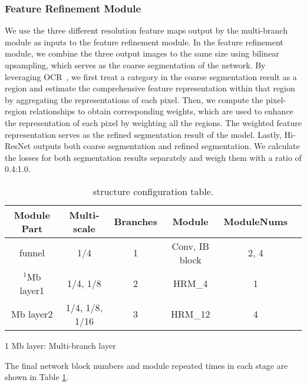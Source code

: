 \documentclass[journal]{IEEEtran}
\begin{document}
\subsubsection{Feature Refinement Module}
We use the three different resolution feature maps output by the multi-branch module as inputs to the feature refinement module. In the feature refinement module, we combine the three output images to the same size using bilinear upsampling, which serves as the coarse segmentation of the network. By leveraging OCR~\cite{yuan2019segmentation}, we first treat a category in the coarse segmentation result as a region and estimate the comprehensive feature representation within that region by aggregating the representations of each pixel. Then, we compute the pixel-region relationships to obtain corresponding weights, which are used to enhance the representation of each pixel by weighting all the regions. The weighted feature representation serves as the refined segmentation result of the model. Lastly, Hi-ResNet outputs both coarse segmentation and refined segmentation. We calculate the losses for both segmentation results separately and weigh them with a ratio of 0.4:1.0.


\begin{table}[!ht]
  \begin{center}
  \begin{threeparttable}
  \scriptsize
    \caption{structure configuration table.}
    \begin{tabular}{c|c c c c c}
    \hline
      \textbf{Module Part} & \textbf{Multi-scale} & \textbf{Branches} & \textbf{Module} & \textbf{ModuleNums}\\
      \hline
      funnel & 1/4 & 1 & Conv, IB block & 2, 4\\
      $^{\scriptscriptstyle1}$Mb layer1 & 1/4, 1/8 & 2 & HRM\_4 & 1\\
      Mb layer2 & 1/4, 1/8, 1/16 & 3 & HRM\_12 & 4\\
      \hline
    \end{tabular}
        \begin{tablenotes}
        \footnotesize  
        \item[1] Mb layer: Multi-branch layer
      \end{tablenotes} 
    \end{threeparttable}
  \end{center}
  \label{table:1}
\end{table}
The final network block numbers and module repeated times in each stage are shown in Table \ref{table:1}.
\end{document}

